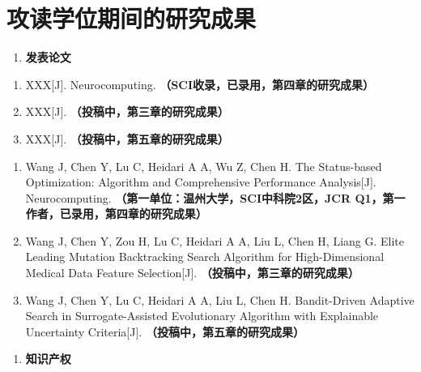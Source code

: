 \documentclass{wzuthesis} %
\begin{document}
    \newpage
\fi
\chapter{攻读学位期间的研究成果}

\begin{enumerate}[label=\arabic*.]
    \item \textbf{发表论文}
\end{enumerate}

\ifdefined\blind  %
    \begin{enumerate}
        \renewcommand{\labelenumi}{[\arabic{enumi}]}
        \setlength{\itemindent}{0em}
        \setlength{\labelsep}{0.5em}

        \item XXX[J]. Neurocomputing. \textbf{（SCI收录，已录用，第四章的研究成果）}
        \item XXX[J]. \textbf{（投稿中，第三章的研究成果）}
        \item XXX[J]. \textbf{（投稿中，第五章的研究成果）}
    \end{enumerate}
\else
    \begin{enumerate}
        \renewcommand{\labelenumi}{[\arabic{enumi}]}
        \setlength{\itemindent}{0em}
        \setlength{\labelsep}{0.5em}

        \item Wang J, Chen Y, Lu C, Heidari A A, Wu Z, Chen H. The Status-based Optimization: Algorithm and Comprehensive Performance Analysis[J]. Neurocomputing. \textbf{（第一单位：温州大学，SCI中科院2区，JCR Q1，第一作者，已录用，第四章的研究成果）}
        \item Wang J, Chen Y, Zou H, Lu C, Heidari A A, Liu L, Chen H, Liang G. Elite Leading Mutation Backtracking Search Algorithm for High-Dimensional Medical Data Feature Selection[J]. \textbf{（投稿中，第三章的研究成果）}
        \item Wang J, Chen Y, Lu C, Heidari A A, Liu L, Chen H. Bandit-Driven Adaptive Search in Surrogate-Assisted Evolutionary Algorithm with Explainable Uncertainty Criteria[J]. \textbf{（投稿中，第五章的研究成果）}
    \end{enumerate}
\fi

\ifdefined\blind
\else
    \begin{enumerate}[label=\arabic*., start=2]
        \item \textbf{知识产权}
    \end{enumerate}
\end{document}
